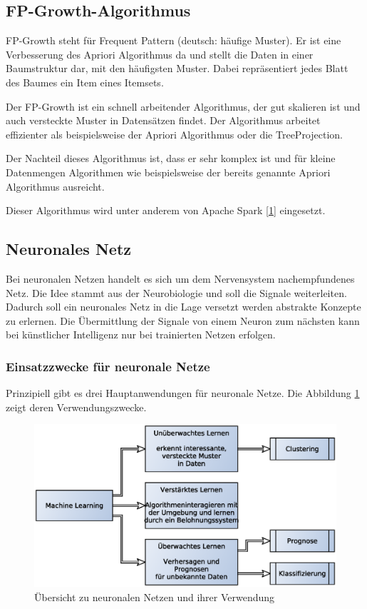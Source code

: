 \subsection{FP-Growth-Algorithmus}
FP-Growth steht für Frequent Pattern (deutsch: häufige Muster). Er ist eine Verbesserung des Apriori Algorithmus da und stellt die Daten in einer Baumstruktur dar, mit den häufigsten Muster. Dabei repräsentiert jedes Blatt des Baumes ein Item eines Itemsets.\vspace{0.2cm}

Der FP-Growth ist ein schnell arbeitender Algorithmus, der gut skalieren ist und auch versteckte Muster in Datensätzen findet. Der Algorithmus arbeitet effizienter als beispielsweise der Apriori Algorithmus oder die TreeProjection.\vspace{0.2cm}

Der Nachteil dieses Algorithmus ist, dass er sehr komplex ist und für kleine Datenmengen Algorithmen wie beispielsweise der bereits genannte Apriori Algorithmus ausreicht.\vspace{0.2cm}

Dieser Algorithmus wird unter anderem von Apache Spark [\href{https://spark.apache.org/docs/latest/ml-frequent-pattern-mining.html}{1}] eingesetzt.

\subsection{Neuronales Netz}
Bei neuronalen Netzen handelt es sich um dem Nervensystem nachempfundenes Netz. Die Idee stammt aus der Neurobiologie und soll die Signale weiterleiten. Dadurch soll ein neuronales Netz in die Lage versetzt werden abstrakte Konzepte zu erlernen. Die Übermittlung der Signale von einem Neuron zum nächsten kann bei künstlicher Intelligenz nur bei trainierten Netzen erfolgen.

\subsubsection{Einsatzzwecke für neuronale Netze}
Prinzipiell gibt es drei Hauptanwendungen für neuronale Netze. Die Abbildung \ref{img:types_of_ml} zeigt deren Verwendungszwecke.\vspace{0.2cm}

\begin{figure}[!ht]
	\centering
	\includegraphics[width=\linewidth]{images/chapter5/ml_types.eps}
	\caption{Übersicht zu neuronalen Netzen und ihrer Verwendung}
	\label{img:types_of_ml}
\end{figure}

